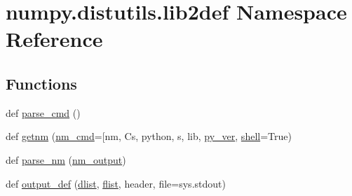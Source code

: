 \hypertarget{namespacenumpy_1_1distutils_1_1lib2def}{}\section{numpy.\+distutils.\+lib2def Namespace Reference}
\label{namespacenumpy_1_1distutils_1_1lib2def}
\subsection*{Functions}
\begin{DoxyCompactItemize}
\item 
def \hyperlink{namespacenumpy_1_1distutils_1_1lib2def_afe630e4988f810a2991af3b4fef70f03}{parse\+\_\+cmd} ()
\item 
def \hyperlink{namespacenumpy_1_1distutils_1_1lib2def_ad1913aa0e63c4f86983cb16894e6d1c0}{getnm} (\hyperlink{namespacenumpy_1_1distutils_1_1lib2def_a02e08fdc47aabf6e8e913caf6e2f17bc}{nm\+\_\+cmd}=\mbox{[}\textquotesingle{}nm\textquotesingle{}, Cs, python, s, lib, \hyperlink{namespacenumpy_1_1distutils_1_1lib2def_a3c47df93e168fb41138c5dc18682f4ee}{py\+\_\+ver}, \hyperlink{namespacenumpy_1_1distutils_1_1lib2def_a9826a216321d2681304aee4789512b70}{shell}=True)
\item 
def \hyperlink{namespacenumpy_1_1distutils_1_1lib2def_a8c398cc91413881af79a84352fc29564}{parse\+\_\+nm} (\hyperlink{namespacenumpy_1_1distutils_1_1lib2def_ab061d718d116dde548ef775b7507ef84}{nm\+\_\+output})
\item 
def \hyperlink{namespacenumpy_1_1distutils_1_1lib2def_af9f8c10056e760072f68ca2fa1474c3b}{output\+\_\+def} (\hyperlink{namespacenumpy_1_1distutils_1_1lib2def_a002146b7fc15a64b401adef648369357}{dlist}, \hyperlink{namespacenumpy_1_1distutils_1_1lib2def_a08fd4fe9e0d4800719befffd95ccf65d}{flist}, header, file=sys.\+stdout)
\end{DoxyCompactItemize}
